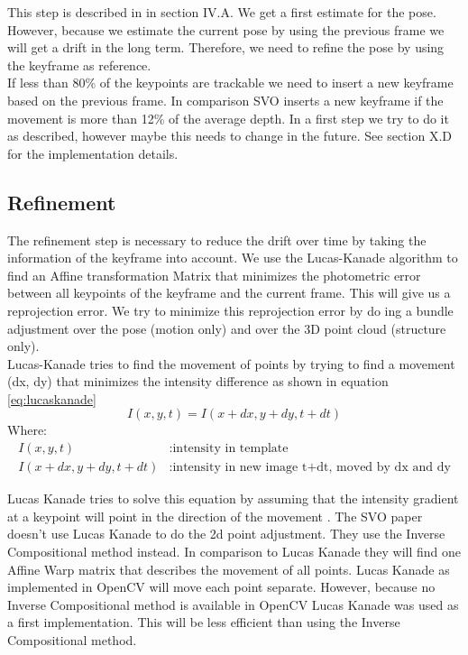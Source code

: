 \documentclass[11pt,a4paper,titlepage,oneside]{report}
\begin{document}
This step is described in \cite{svo2} in section IV.A. We get a first estimate for the pose. However, because we estimate the current pose by using the previous frame we will get a drift in the long term. Therefore, we need to refine the pose by using the keyframe as reference.\\
If less than 80\% of the keypoints are trackable we need to insert a new keyframe based on the previous frame. In comparison SVO inserts a new keyframe if the movement is more than 12\% of the average depth. In a first step we try to do it as described, however maybe this needs to change in the future. See \cite{svo2} section X.D for the implementation details.

\subsection{Refinement}\label{sec:refinement}

The refinement step is necessary to reduce the drift over time by taking the information of the keyframe into account. We use the Lucas-Kanade algorithm to find an Affine transformation Matrix that minimizes the photometric error between all keypoints of the keyframe and the current frame. This will give us a reprojection error. We try to minimize this reprojection error by do ing a bundle adjustment over the pose (motion only) and over the 3D point cloud (structure only).\\

Lucas-Kanade tries to find the movement of points by trying to find a movement (dx, dy) that minimizes the intensity difference as shown in equation \ref{eq:lucaskanade}
\begin{equation}\label{eq:lucaskanade}
	I(x,y,t)=I(x+dx, y+dy, t+dt)
\end{equation}
Where:
\begin{align*}
	I(x,y,t)						&:	\text{intensity in template}\\
	I(x+dx, y+dy, t+dt) &:	\text{intensity in new image t+dt, moved by dx and dy}
\end{align*}

Lucas Kanade tries to solve this equation by assuming that the intensity gradient at a keypoint will point in the direction of the movement \cite{lucas_kanade}. The SVO paper doesn't use Lucas Kanade to do the 2d point adjustment. They use the Inverse Compositional method instead. In comparison to Lucas Kanade they will find one Affine Warp matrix that describes the movement of all points. Lucas Kanade as implemented in OpenCV will move each point separate. However, because no Inverse Compositional method is available in OpenCV Lucas Kanade was used as a first implementation. This will be less efficient than using the Inverse Compositional method.
\end{document}
